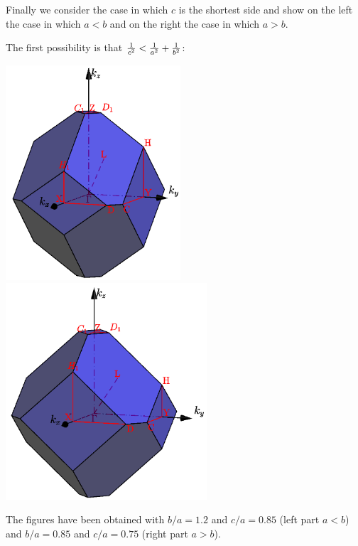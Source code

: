 \documentclass[12pt,a4paper]{article}
\begin{document}
Finally we consider the case in which $c$ is the shortest side and show on
the left the case in which $a<b$ and on the right the case in which $a>b$. 

The first possibility is that ${1\over c^2}<{1\over a^2} + {1\over b^2}$:
\begin{center}
\includegraphics[width=6.5cm,angle=0]{images/ofc_5.png} \hspace{1cm}
\includegraphics[width=7.5cm,angle=0]{images/ofc_6.png} 
\end{center}
The figures have been obtained with $b/a=1.2$ and $c/a=0.85$ (left part $a<b$)
and $b/a=0.85$ and $c/a=0.75$ (right part $a>b$).
\end{document}
